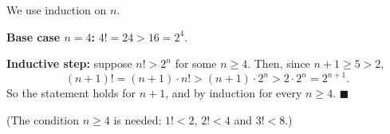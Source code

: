 We use induction on $n$.

\textbf{Base case $n=4$:} $4!=24>16=2^4$.

\textbf{Inductive step:} suppose $n!>2^n$ for some $n\ge4$. Then, since $n+1\ge5>2$,
\[(n+1)!=(n+1)\cdot n!>(n+1)\cdot2^n>2\cdot2^n=2^{n+1}.\]
So the statement holds for $n+1$, and by induction for every $n\ge4$. $\blacksquare$

(The condition $n\ge4$ is needed: $1!<2$, $2!<4$ and $3!<8$.)
